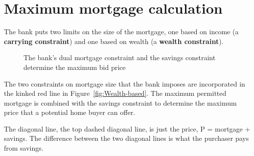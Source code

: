 \section{Maximum mortgage calculation}
The bank puts two  limits on the size of the mortgage, one based on income (a \textbf{carrying constraint}) and one based on wealth (a \textbf{wealth constraint}).



\begin{figure}
\centering
{}
\caption{The bank's dual mortgage constraint and the savings constraint determine the maximum bid price}
\label{fig:my_label2}
\end{figure}


The two constraints on  mortgage size that the bank imposes are incorporated in the kinked red line in Figure~\ref{fig:Wealth-based}. The maximum  permitted mortgage is combined with the savings constraint to determine the maximum price that a potential home buyer can offer.   

The diagonal line, the top dashed diagonal line, is just the price, P = mortgage + savings.
The difference between the two diagonal lines is what the purchaser pays from savings.  

